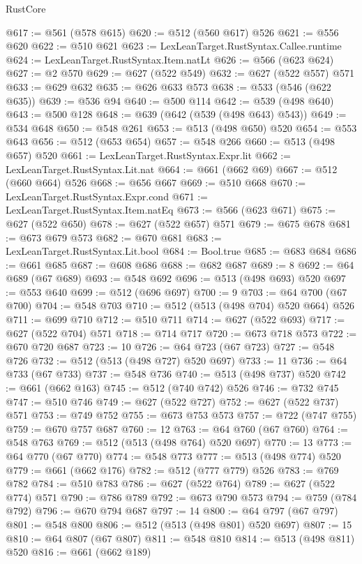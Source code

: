 \begin{lexlean}{RustCore}
\begin{coremodule}
@617 := @561 (@578 @615)
@620 := @512 (@560 @617) @526
@621 := @556 @620
@622 := @510 @621
@623 := LexLeanTarget.RustSyntax.Callee.runtime
@624 := LexLeanTarget.RustSyntax.Item.natLt
@626 := @566 (@623 @624)
@627 := @2 @570
@629 := @627 (@522 @549)
@632 := @627 (@522 @557) @571
@633 := @629 @632
@635 := @626 @633 @573
@638 := @533 (@546 (@622 @635))
@639 := @536 @94
@640 := @500 @114
@642 := @539 (@498 @640)
@643 := @500 @128
@648 := @639 (@642 (@539 (@498 @643) @543))
@649 := @534 @648
@650 := @548 @261
@653 := @513 (@498 @650) @520
@654 := @553 @643
@656 := @512 (@653 @654)
@657 := @548 @266
@660 := @513 (@498 @657) @520
@661 := LexLeanTarget.RustSyntax.Expr.lit
@662 := LexLeanTarget.RustSyntax.Lit.nat
@664 := @661 (@662 @69)
@667 := @512 (@660 @664) @526
@668 := @656 @667
@669 := @510 @668
@670 := LexLeanTarget.RustSyntax.Expr.cond
@671 := LexLeanTarget.RustSyntax.Item.natEq
@673 := @566 (@623 @671)
@675 := @627 (@522 @650)
@678 := @627 (@522 @657) @571
@679 := @675 @678
@681 := @673 @679 @573
@682 := @670 @681
@683 := LexLeanTarget.RustSyntax.Lit.bool
@684 := Bool.true
@685 := @683 @684
@686 := @661 @685
@687 := @608 @686
@688 := @682 @687
@689 := 8
@692 := @64 @689 (@67 @689)
@693 := @548 @692
@696 := @513 (@498 @693) @520
@697 := @553 @640
@699 := @512 (@696 @697)
@700 := 9
@703 := @64 @700 (@67 @700)
@704 := @548 @703
@710 := @512 (@513 (@498 @704) @520 @664) @526
@711 := @699 @710
@712 := @510 @711
@714 := @627 (@522 @693)
@717 := @627 (@522 @704) @571
@718 := @714 @717
@720 := @673 @718 @573
@722 := @670 @720 @687
@723 := 10
@726 := @64 @723 (@67 @723)
@727 := @548 @726
@732 := @512 (@513 (@498 @727) @520 @697)
@733 := 11
@736 := @64 @733 (@67 @733)
@737 := @548 @736
@740 := @513 (@498 @737) @520
@742 := @661 (@662 @163)
@745 := @512 (@740 @742) @526
@746 := @732 @745
@747 := @510 @746
@749 := @627 (@522 @727)
@752 := @627 (@522 @737) @571
@753 := @749 @752
@755 := @673 @753 @573
@757 := @722 (@747 @755)
@759 := @670 @757 @687
@760 := 12
@763 := @64 @760 (@67 @760)
@764 := @548 @763
@769 := @512 (@513 (@498 @764) @520 @697)
@770 := 13
@773 := @64 @770 (@67 @770)
@774 := @548 @773
@777 := @513 (@498 @774) @520
@779 := @661 (@662 @176)
@782 := @512 (@777 @779) @526
@783 := @769 @782
@784 := @510 @783
@786 := @627 (@522 @764)
@789 := @627 (@522 @774) @571
@790 := @786 @789
@792 := @673 @790 @573
@794 := @759 (@784 @792)
@796 := @670 @794 @687
@797 := 14
@800 := @64 @797 (@67 @797)
@801 := @548 @800
@806 := @512 (@513 (@498 @801) @520 @697)
@807 := 15
@810 := @64 @807 (@67 @807)
@811 := @548 @810
@814 := @513 (@498 @811) @520
@816 := @661 (@662 @189)

\end{coremodule}
\end{lexlean}
